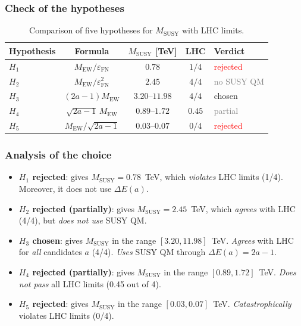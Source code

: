\documentclass[11pt,a4paper]{article}
\theoremstyle{definition}
\begin{document}
\subsubsection{Check of the hypotheses}

\begin{table}[ht]
\centering
\caption{Comparison of five hypotheses for $M_{\text{SUSY}}$ with LHC limits.}
\label{tab:hypotheses-main}
\begin{tabular}{lcccl}
\toprule
Hypothesis & Formula & $M_{\text{SUSY}}$ [TeV] & LHC & Verdict \\
\midrule
$H_1$ & $M_{\text{EW}}/\varepsilon_{\text{FN}}$
      & $0.78$    & $1/4$ & \textcolor{red}{rejected} \\
$H_2$ & $M_{\text{EW}}/\varepsilon_{\text{FN}}^{2}$
      & $2.45$    & $4/4$ & \textcolor{gray}{no SUSY QM} \\
$H_3$ & $(2a - 1) M_{\text{EW}}$
      & $3.20$--$11.98$ & $4/4$ & \textcolor{green!60!black}{chosen} \\
$H_4$ & $\sqrt{2a-1}\,M_{\text{EW}}$
      & $0.89$--$1.72$  & $0.45$ & \textcolor{gray}{partial} \\
$H_5$ & $M_{\text{EW}}/\sqrt{2a-1}$
      & $0.03$--$0.07$  & $0/4$ & \textcolor{red}{rejected} \\
\bottomrule
\end{tabular}
\end{table}

\subsubsection{Analysis of the choice}

\begin{itemize}
    \item \textbf{$H_1$ rejected}: gives $M_{\text{SUSY}} = 0.78$~TeV,
          which \emph{violates} LHC limits (1/4). Moreover,
          it does not use $\Delta E(a)$.
    \item \textbf{$H_2$ rejected (partially)}: gives
          $M_{\text{SUSY}} = 2.45$~TeV, which \emph{agrees}
          with LHC (4/4), but \emph{does not use} SUSY QM.
    \item \textbf{$H_3$ chosen}: gives $M_{\text{SUSY}}$
          in the range $[3.20, 11.98]$~TeV. \emph{Agrees}
          with LHC for \emph{all} candidates $a$ (4/4).
          \emph{Uses} SUSY QM through $\Delta E(a) = 2a - 1$.
    \item \textbf{$H_4$ rejected (partially)}: gives
          $M_{\text{SUSY}}$ in the range $[0.89, 1.72]$~TeV.
          \emph{Does not pass} all LHC limits (0.45 out of 4).
    \item \textbf{$H_5$ rejected}: gives $M_{\text{SUSY}}$
          in the range $[0.03, 0.07]$~TeV. \emph{Catastrophically}
          violates LHC limits (0/4).
\end{itemize}
\end{document}
